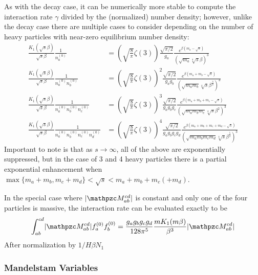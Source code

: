 \documentclass[
  a4paper,             %
  11pt,                %
  oneside,             %
  onecolumn,           %
  bibliography=totoc,  %
  final,               %
]{scrartcl}
\begin{document}
As with the decay case, it can be numerically more stable to compute the
interaction rate \(\gamma\) divided by the (normalized) number density; however,
unlike the decay case there are multiple cases to consider depending on the
number of heavy particles with near-zero equilibrium number density:
\begin{subequations}
  \begin{align}
    \frac{K_1(\sqrt s \beta)}{\sqrt s \beta} \frac{1}{n_a^{(0)}}
    &= \left( \sqrt{\frac{8}{\pi}} \zeta(3) \right) \frac{\sqrt{\pi / 2}}{g_a} \frac{e^{\beta (m_a - \sqrt{s})}}{(\sqrt{m_a} \sqrt[4]{s} \beta)^3} \\
    \frac{K_1(\sqrt s \beta)}{\sqrt s \beta} \frac{1}{n_a^{(0)} n_b^{(0)}}
    &= \left( \sqrt{\frac{8}{\pi}} \zeta(3) \right)^2 \frac{\sqrt{\pi / 2}}{g_a g_b} \frac{e^{\beta (m_a + m_b - \sqrt{s})}}{\left(\sqrt{m_a m_b} \sqrt[4]{s} \beta^\frac{3}{2}\right)^3} \\
    \frac{K_1(\sqrt s \beta)}{\sqrt s \beta} \frac{1}{n_a^{(0)} n_b^{(0)} n_c^{(0)}}
    &= \left( \sqrt{\frac{8}{\pi}} \zeta(3) \right)^3 \frac{\sqrt{\pi / 2}}{g_a g_b g_c} \frac{e^{\beta (m_a + m_b + m_c - \sqrt{s})}}{\left(\sqrt{m_a m_b m_c} \sqrt[4]{s} \beta^2\right)^3} \\
    \frac{K_1(\sqrt s \beta)}{\sqrt s \beta} \frac{1}{n_a^{(0)} n_b^{(0)} n_c^{(0)} n_d^{(0)}}
    &= \left( \sqrt{\frac{8}{\pi}} \zeta(3) \right)^4 \frac{\sqrt{\pi / 2}}{g_a g_b g_c g_d} \frac{e^{\beta (m_a + m_b + m_c + m_d - \sqrt{s})}}{\left(\sqrt{m_a m_b m_c m_d} \sqrt[4]{s} \beta^\frac{5}{2} \right)^3}
  \end{align}
\end{subequations}
Important to note is that as \(s \to \infty\), all of the above are
exponentially suppressed, but in the case of 3 and 4 heavy particles there is a
partial exponential enhancement when \(\max\{m_a + m_b, m_c +
m_d\} < \sqrt{s} < m_a + m_b + m_c (+ m_d)\).

In the special case where \(\abs{\pzcM_{ab}^{cd}}\) is constant and only one of
the four particles is massive, the interaction rate can be evaluated exactly to
be
\begin{equation}
  \int_{ab}^{cd} \abs{\pzcM_{ab}^{cd}} f_a^{(0)} f_b^{(0)}
  = \frac{g_a g_b g_c g_d}{128 \pi^5} \frac{m K_1(m \beta)}{\beta^3} \abs{\pzcM_{ab}^{cd}}
\end{equation}
After normalization by \(1 / H \beta N_1\)

\subsubsection{Mandelstam Variables}%
\label{sec:mandelstam_variables}
\end{document}
